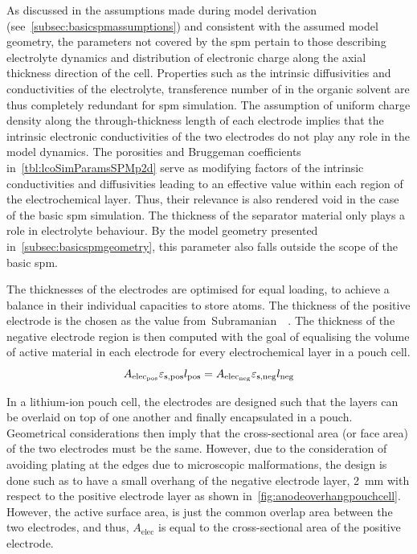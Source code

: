 As    discussed   in    the   assumptions    made   during    model   derivation
(see~\cref{subsec:basicspmassumptions})  and consistent  with the  assumed model
geometry,  the  parameters  not  covered  by  the  \gls{spm}  pertain  to  those
describing electrolyte dynamics and distribution  of electronic charge along the
axial  thickness  direction  of  the  cell. Properties  such  as  the  intrinsic
diffusivities  and conductivities  of  the electrolyte,  transference number  of
 in  the organic  solvent are thus  completely redundant  for \gls{spm}
simulation. The assumption of uniform charge density along the through-thickness
length of each electrode implies that the intrinsic electronic conductivities of
the two electrodes  do not play any  role in the model  dynamics. The porosities
and Bruggeman  coefficients in~\cref{tbl:lcoSimParamsSPMp2d} serve  as modifying
factors  of  the  intrinsic  conductivities  and  diffusivities  leading  to  an
effective value  within each  region of the  electrochemical layer.  Thus, their
relevance is also  rendered void in the case of  the basic \gls{spm} simulation.
The  thickness of  the  separator  material only  plays  a  role in  electrolyte
behaviour.  By the  model geometry  presented in~\cref{subsec:basicspmgeometry},
this parameter also falls outside the scope of the basic \gls{spm}.

The  thicknesses  of the  electrodes  are  optimised  for equal  loading,  \ie{}
to  achieve  a   balance  in  their  individual  capacities   to  store  
atoms.  The thickness  of the  positive  electrode is  the chosen  as the  value
from~Subramanian~\etal{}~\cite{Subramanian2009}. The  thickness of  the negative
electrode region  is then  computed with  the goal of  equalising the  volume of
active material  in each electrode  for every  electrochemical layer in  a pouch
cell.
\begin{equation}\label{eq:basiccapacitybalance}
    A_{\text{elec}_\text{pos}}\varepsilon_{\text{s,pos}} l_\text{pos} = A_{\text{elec}_\text{neg}}\varepsilon_{\text{s,neg}} l_\text{neg}
\end{equation}

In a  lithium-ion pouch cell, the  electrodes are designed such  that the layers
can be  overlaid on  top of  one another  and finally  encapsulated in  a pouch.
Geometrical considerations  then imply  that the  cross-sectional area  (or face
area) of the two electrodes must be  the same. However, due to the consideration
of  avoiding  plating  at  the  edges  due  to  microscopic  malformations,  the
design  is done  such as  to have  a small  overhang of  the negative  electrode
layer,  \approx\SI{2}{\milli  \meter} with  respect  to  the positive  electrode
layer  as  shown  in~\cref{fig:anodeoverhangpouchcell}.
However, the  active surface area, is  just the common overlap  area between the
two electrodes, and  thus, $A_\text{elec}$ is equal to  the cross-sectional area
of the positive electrode.

